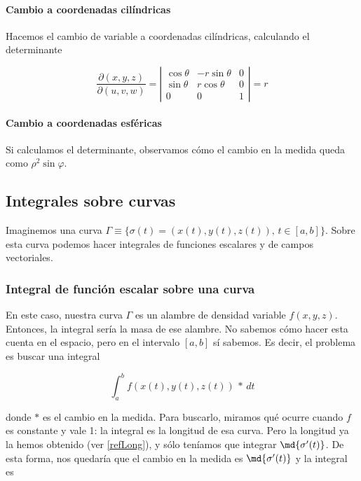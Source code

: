 \documentclass[12pt,a4paper,titlepage]{apuntes}
\begin{document}
\paragraph{Cambio a coordenadas cilíndricas}

Hacemos el cambio de variable a coordenadas cilíndricas, calculando el determinante

\[ \frac{∂(x,y,z)}{∂(u,v,w)} = \left|\begin{matrix}
\cos\theta & -r\sin\theta & 0\\
\sin\theta & r\cos\theta & 0 \\
0& 0 & 1
\end{matrix}\right| = r \]

\paragraph{Cambio a coordenadas esféricas}

Si calculamos el determinante, observamos cómo el cambio en la medida queda como $\rho^2\sin\varphi$.

\subsection{Integrales sobre curvas}
Imaginemos una curva $\Gamma \equiv \{ \sigma(t) = (x(t), y(t), z(t)),\, t\in [a,b]\}$. Sobre esta curva podemos hacer integrales de funciones escalares y de campos vectoriales.

\subsubsection{Integral de función escalar sobre una curva}

En este caso, nuestra curva $\Gamma$ es un alambre de densidad variable $f(x,y,z)$. Entonces, la integral sería la masa de ese alambre. No sabemos cómo hacer esta cuenta en el espacio, pero en el intervalo $[a,b]$ sí sabemos. Es decir, el problema es buscar una integral

\[ \int_a^b f(x(t), y(t), z(t))\,\ast\,dt \]

donde $\ast$ es el cambio en la medida. Para buscarlo, miramos qué ocurre cuando $f$ es constante y vale 1: la integral es la longitud de esa curva. Pero la longitud ya la hemos obtenido (ver \ref{refLong}), y sólo teníamos que integrar $\md{\sigma'(t)}$. De esta forma, nos quedaría que el cambio en la medida es $\md{\sigma'(t)}$ y la integral es 
\end{document}
